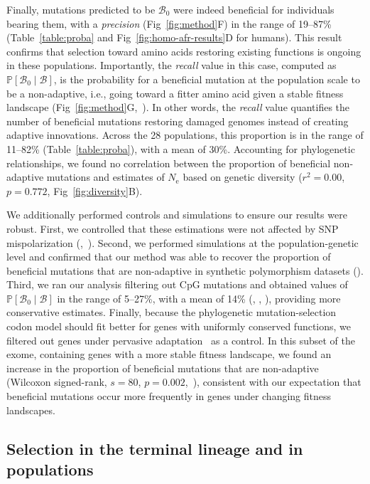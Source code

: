 \documentclass[10pt,letterpaper]{article}
\newcommand{\Ne}{N_{\text{e}}}
\newcommand{\proba}{\mathbb{P}}
\newcommand{\SphyBen}{\mathcal{B}_0}
\newcommand{\given}{\mid}
\newcommand{\SpopBen}{\mathcal{B}}
\begin{document}
Finally, mutations predicted to be $\SphyBen$ were indeed beneficial for individuals bearing them, with a \textit{precision} (Fig~\ref{fig:method}F) in the range of 19--87\% (Table~\ref{table:proba} and Fig~\ref{fig:homo-afr-results}D for humans).
This result confirms that selection toward amino acids restoring existing functions is ongoing in these populations.
Importantly, the \textit{recall} value in this case, computed as $\proba [ \SphyBen \given \SpopBen]$, is the probability for a beneficial mutation at the population scale to be a non-adaptive, i.e., going toward a fitter amino acid given a stable fitness landscape (Fig~\ref{fig:method}G,~).
In other words, the \textit{recall} value quantifies the number of beneficial mutations restoring damaged genomes instead of creating adaptive innovations.
Across the 28 populations, this proportion is in the range of 11--82\% (Table~\ref{table:proba}), with a mean of 30\%.
Accounting for phylogenetic relationships, we found no correlation between the proportion of beneficial non-adaptive mutations and estimates of $\Ne$ based on genetic diversity ($r^2=0.00$, $p=0.772$, Fig~\ref{fig:diversity}B).

We additionally performed controls and simulations to ensure our results were robust.
First, we controlled that these estimations were not affected by SNP mispolarization (,~).
Second, we performed simulations at the population-genetic level and confirmed that our method was able to recover the proportion of beneficial mutations that are non-adaptive in synthetic polymorphism datasets ().
Third, we ran our analysis filtering out CpG mutations and obtained values of $\proba [ \SphyBen \given \SpopBen]$ in the range of 5--27\%, with a mean of 14\% (, , ), providing more conservative estimates.
Finally, because the phylogenetic mutation-selection codon model should fit better for genes with uniformly conserved functions, we filtered out genes under pervasive adaptation~\cite{latrille_genes_2023} as a control.
In this subset of the exome, containing genes with a more stable fitness landscape, we found an increase in the proportion of beneficial mutations that are non-adaptive (Wilcoxon signed-rank, $s=80$, $p=0.002$,~), consistent with our expectation that beneficial mutations occur more frequently in genes under changing fitness landscapes.

\subsection*{Selection in the terminal lineage and in populations}
\end{document}
